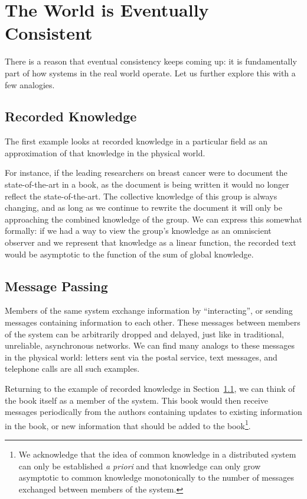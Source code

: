 \documentclass[english]{article}
\begin{document}
\section{The World is Eventually Consistent}
There is a reason that eventual consistency keeps coming up: it is fundamentally part of how systems in the real world operate.  Let us further explore this with a few analogies.  

\subsection{Recorded Knowledge}
\label{recorded_knowledge}
The first example looks at recorded knowledge in a particular field as an approximation of that knowledge in the physical world.

For instance, if the leading researchers on breast cancer were to document the state-of-the-art in a book, as the document is being written it would no longer reflect the state-of-the-art.  The collective knowledge of this group is always changing, and as long as we continue to rewrite the document it will only be approaching the combined knowledge of the group.  We can express this somewhat formally: if we had a way to view the group's knowledge as an omniscient observer and we represent that knowledge as a linear function, the recorded text would be asymptotic to the function of the sum of global knowledge.

\subsection{Message Passing}
Members of the same system exchange information by ``interacting'', or sending messages containing information to each other.  These messages between members of the system can be arbitrarily dropped and delayed, just like in traditional, unreliable, asynchronous networks.  We can find many analogs to these messages in the physical world: letters sent via the postal service, text messages, and telephone calls are all such examples.

Returning to the example of recorded knowledge in Section~\ref{recorded_knowledge}, we can think of the book itself as a member of the system.  This book would then receive messages periodically from the authors containing updates to existing information in the book, or new information that should be added to the book\footnote{We acknowledge that the idea of common knowledge in a distributed system can only be established \textit{a priori} \cite{halpern1990knowledge} and that knowledge can only grow asymptotic to common knowledge monotonically to the number of messages exchanged between members of the system.}.
\end{document}
